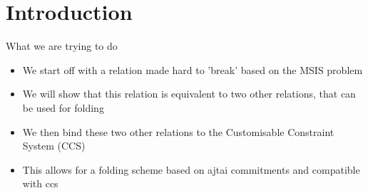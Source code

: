 \section{Introduction}
\begin{frame}{What we are trying to do}
    \begin{itemize}
        \item We start off with a relation made hard to 'break' based on the MSIS problem
        \item We will show that this relation is equivalent to two other relations, that can be used for folding
        \item We then bind these two other relations to the Customisable Constraint System (CCS)
        \item This allows for a folding scheme based on ajtai commitments and compatible with ccs
    \end{itemize}
\end{frame}